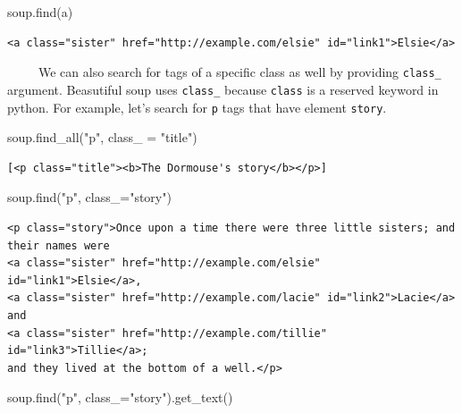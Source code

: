 \documentclass[
  letterpaper,
  DIV=11,
  numbers=noendperiod]{scrreprt}
\newenvironment{Shaded}{\begin{snugshade}}{\end{snugshade}}
\newcommand{\NormalTok}[1]{\textcolor[rgb]{0.00,0.23,0.31}{#1}}
\newcommand{\OperatorTok}[1]{\textcolor[rgb]{0.37,0.37,0.37}{#1}}
\newcommand{\StringTok}[1]{\textcolor[rgb]{0.13,0.47,0.30}{#1}}
\begin{document}
\begin{Shaded}
\begin{Highlighting}[]
\NormalTok{soup.find(}\StringTok{\textquotesingle{}a\textquotesingle{}}\NormalTok{)}
\end{Highlighting}
\end{Shaded}

\begin{verbatim}
<a class="sister" href="http://example.com/elsie" id="link1">Elsie</a>
\end{verbatim}

~~~~~We can also search for tags of a specific class as well by
providing \texttt{class\_} argument. Beasutiful soup uses
\texttt{class\_} because \texttt{class} is a reserved keyword in python.
For example, let's search for \texttt{p} tags that have element
\texttt{story}.

\begin{Shaded}
\begin{Highlighting}[]
\NormalTok{soup.find\_all(}\StringTok{"p"}\NormalTok{, class\_ }\OperatorTok{=} \StringTok{"title"}\NormalTok{)}
\end{Highlighting}
\end{Shaded}

\begin{verbatim}
[<p class="title"><b>The Dormouse's story</b></p>]
\end{verbatim}

\begin{Shaded}
\begin{Highlighting}[]
\NormalTok{soup.find(}\StringTok{"p"}\NormalTok{, class\_}\OperatorTok{=}\StringTok{"story"}\NormalTok{)}
\end{Highlighting}
\end{Shaded}

\begin{verbatim}
<p class="story">Once upon a time there were three little sisters; and their names were
<a class="sister" href="http://example.com/elsie" id="link1">Elsie</a>,
<a class="sister" href="http://example.com/lacie" id="link2">Lacie</a> and
<a class="sister" href="http://example.com/tillie" id="link3">Tillie</a>;
and they lived at the bottom of a well.</p>
\end{verbatim}

\begin{Shaded}
\begin{Highlighting}[]
\NormalTok{soup.find(}\StringTok{"p"}\NormalTok{, class\_}\OperatorTok{=}\StringTok{"story"}\NormalTok{).get\_text()}
\end{Highlighting}
\end{Shaded}
\end{document}

